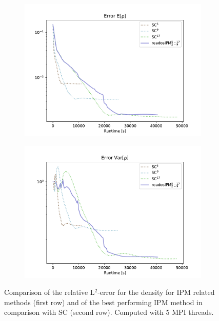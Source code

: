 \begin{figure}[h!]
	\begin{subfigure}{0.5\linewidth}
		\centering
				\includegraphics[scale=0.55]{figs/errorEuler/L2_error_E[rho]_sc.pdf}
		\label{fig:sub33}
		\caption{}
	\end{subfigure}%
	\begin{subfigure}{0.5\linewidth}
		\centering
				\includegraphics[scale=0.55]{figs/errorEuler/L2_error_Var[rho]_sc.pdf}
		\label{fig:sub34}
		\caption{}
	\end{subfigure}
	\caption{Comparison of the relative L$^2$-error for the density for IPM related methods (first row) and of the best performing IPM method in comparison with SC (second row). Computed with 5 MPI threads.}
	\label{fig:L2ErrorSolution}
\end{figure}
